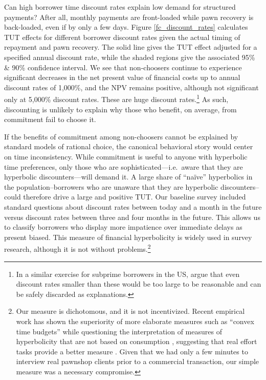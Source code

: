 \documentclass[12pt, a4paper]{article}
\begin{document}
Can high borrower time discount rates explain low demand for structured payments? %
After all, monthly payments are front-loaded while pawn recovery is back-loaded, even if by only a few days.  
Figure \ref{fc_discount_rates} calculates TUT effects for different borrower discount rates given the actual timing of repayment and pawn recovery. The solid line gives the TUT effect adjusted for a specified annual discount rate, while the shaded regions give the associated 95\% \& 90\% confidence interval.
We see that non-choosers continue to experience significant decreases in the net present value of financial costs up to annual discount rates of 1,000\%, and the NPV remains positive, although not significant only at 5,000\% discount rates. These are huge discount rates.\footnote{In a similar exercise for subprime borrowers in the US, \cite{Levin} argue that even discount rates smaller than these would be too large to be reasonable and can be safely discarded as explanations.} As such, discounting is unlikely to explain why those who benefit, on average, from commitment fail to choose it. %


If the benefits of commitment among non-choosers cannot be explained by standard models of rational choice, the canonical behavioral story would center on time inconsistency.  While commitment is useful to anyone with hyperbolic time preferences, only those who are sophisticated---i.e.\ aware that they are hyperbolic discounters---will demand it.  A large share of ``na\"ive'' hyperbolics in the population--borrowers who are unaware that they are hyperbolic discounters--could therefore drive a large and positive $\text{TUT}$.  Our baseline survey included standard questions about discount rates between today and a month in the future versus discount rates between three and four months in the future.
This allows us to classify borrowers who display more impatience over immediate delays as present biased. This measure of financial hyperbolicity is widely used in survey research, although it is not without problems.\footnote{Our measure is dichotomous, and it is not incentivized. Recent empirical work has shown the superiority of more elaborate measures such as ``convex time budgets'' \citep{andreoni2015measuring} while questioning the interpretation of measures of hyperbolicity that are not based on consumption \citep{andreoni2012estimating, cohen2020measuring}, suggesting that real effort tasks provide a better measure \citep{augenblick2015working}.  Given that we had only a few minutes to interview real pawnshop clients prior to a commercial transaction, our simple measure was a necessary compromise.}   
\end{document}
